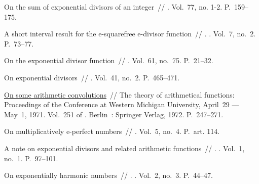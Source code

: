 \documentclass{article}
\begin{document}
\begin{thebibliography}{10}
 On the sum of exponential divisors of an
  integer~// \href{http://dx.doi.org/10.1023/A:1006596009566}{} \BibDash
{}. \BibDash
\newblock Vol.~77, no. 1-2. \BibDash
\newblock P.~159--175.

 A short interval result for the
  e-squarefree e-divisor function~// . \BibDash
{}. \BibDash
\newblock Vol.~7, no.~2. \BibDash
\newblock P.~73--77.

 On the exponential divisor function~//  \BibDash
{}. \BibDash
\newblock Vol.~61, no.~75. \BibDash
\newblock P.~21--32.

 On exponential divisors~//
  \href{http://dx.doi.org/10.1215/S0012-7094-74-04152-0}{} \BibDash
{}. \BibDash
\newblock Vol.~41, no.~2. \BibDash
\newblock P.~465--471.

 \href{http://dx.doi.org/10.1007/BFb0058796}{On some
  arithmetic convolutions}~// The theory of arithmetical functions: Proceedings
  of the Conference at Western Michigan University, April~29 --- May~1, 1971.
  \BibDash
\newblock Vol.~251 of . \BibDash
\newblock Berlin~: Springer Verlag, 1972. \BibDash
\newblock P.~247--271.

 On multiplicatively e-perfect numbers~//  \BibDash
{}. \BibDash
\newblock Vol.~5, no.~4. \BibDash
\newblock P.~art. 114.

 A note on exponential divisors and related arithmetic
  functions~// . \BibDash
{}. \BibDash
\newblock Vol.~1, no.~1. \BibDash
\newblock P.~97--101.

 On exponentially harmonic numbers~// .
  \BibDash
{}. \BibDash
\newblock Vol.~2, no.~3. \BibDash
\newblock P.~44--47.


\end{thebibliography}
\end{document}
